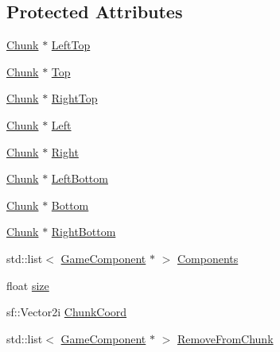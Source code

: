 \subsection*{Protected Attributes}
\begin{DoxyCompactItemize}
\item 
\hyperlink{class_chunk}{Chunk} $\ast$ \hyperlink{class_chunk_a877d51226eaa97c40c05223987514d59}{Left\-Top}
\item 
\hyperlink{class_chunk}{Chunk} $\ast$ \hyperlink{class_chunk_ae841d5ab24dfa5ef8865cb4fa05d089d}{Top}
\item 
\hyperlink{class_chunk}{Chunk} $\ast$ \hyperlink{class_chunk_a8a7593c89d4fe5ed193e68b9ed40016b}{Right\-Top}
\item 
\hyperlink{class_chunk}{Chunk} $\ast$ \hyperlink{class_chunk_aee27c2584364a58dc8811e9ada0695dd}{Left}
\item 
\hyperlink{class_chunk}{Chunk} $\ast$ \hyperlink{class_chunk_a0bcf134e2aba0ca49370272c2b3f17a4}{Right}
\item 
\hyperlink{class_chunk}{Chunk} $\ast$ \hyperlink{class_chunk_af3577f37139ffeb74181d9ce3c48f5e6}{Left\-Bottom}
\item 
\hyperlink{class_chunk}{Chunk} $\ast$ \hyperlink{class_chunk_ac9ac53a727ae045b6f751ec6a68bcaca}{Bottom}
\item 
\hyperlink{class_chunk}{Chunk} $\ast$ \hyperlink{class_chunk_afded01a9a67540c9f64dde5776021f4b}{Right\-Bottom}
\item 
std\-::list$<$ \hyperlink{class_game_component}{Game\-Component} $\ast$ $>$ \hyperlink{class_chunk_a4cdf6febd96ff99b681e37d548617a38}{Components}
\item 
float \hyperlink{class_chunk_af46410b580baf2985b01044d5c041b2e}{size}
\item 
sf\-::\-Vector2i \hyperlink{class_chunk_abb5b1842148b3d7c616065766bfd2b33}{Chunk\-Coord}
\item 
std\-::list$<$ \hyperlink{class_game_component}{Game\-Component} $\ast$ $>$ \hyperlink{class_chunk_adf6692fdab4518524e217cc0ef09d282}{Remove\-From\-Chunk}
\end{DoxyCompactItemize}
